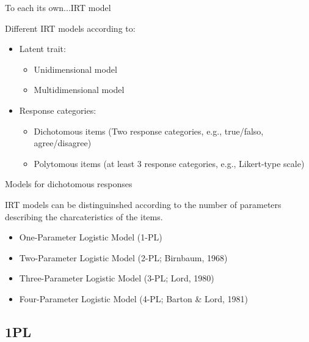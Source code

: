 \documentclass[aspectratio=149, compress]{beamer}
\begin{document}
\begin{frame}{To each its own...IRT model}

Different IRT models according to:
	
\begin{itemize}
	\item Latent trait:
	\begin{itemize}
		\item \textcolor<2>{unipd}{Unidimensional model}
		\item  Multidimensional model	
	\end{itemize}
	
	\item Response categories: 
	
	\begin{itemize}
		\item  \textcolor<2>{unipd}{Dichotomous items} (Two response categories, e.g., true/falso, agree/disagree)
		\item Polytomous items (at least 3 response categories, e.g., Likert-type scale)
	\end{itemize}
\end{itemize} 

\end{frame}

\begin{frame}{Models for dichotomous responses}

IRT models can be distinguinshed according to the number of parameters describing the charcateristics of the items. 
	
	\begin{itemize}
	\item One-Parameter Logistic Model (1-PL)
		
	\item Two-Parameter Logistic Model (2-PL; Birnbaum, 1968)
		
     \item Three-Parameter Logistic Model (3-PL; Lord, 1980)
		
	\item Four-Parameter Logistic Model (4-PL; Barton \& Lord, 1981)
	\end{itemize}
	

	
\end{frame}

\subsection*{1PL}
\end{document}
